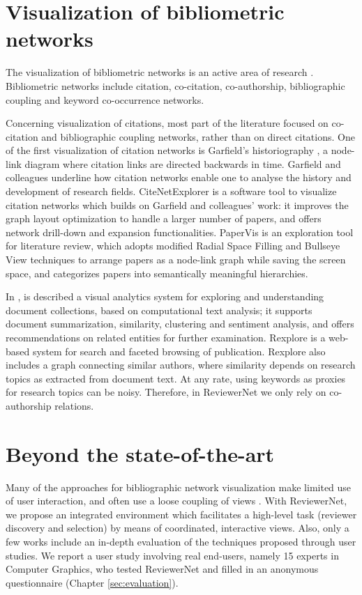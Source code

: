\section{Visualization of bibliometric networks}
\label{sec:bibvis}
The visualization of bibliometric networks is an active area of research \cite{Ch13,FeHe17}. Bibliometric networks include citation, co-citation, co-authorship, bibliographic coupling and keyword co-occurrence networks. 

Concerning visualization of citations, most part of the literature focused on co-citation and bibliographic coupling networks, rather than on direct citations. One of the first visualization of citation networks is Garfield's historiography \cite{GaPu03}, a node-link diagram where citation links are directed backwards in time. Garfield and colleagues underline how citation networks enable one to analyse the history and development of research fields. CiteNetExplorer \cite{vEWa14} is a software tool to visualize citation networks which builds on Garfield and colleagues' work: it improves the graph layout optimization to handle a larger number of papers, and offers network drill-down and expansion functionalities. PaperVis \cite{ChYa11} is an exploration tool for literature review, which adopts modified Radial Space Filling and Bullseye View techniques to arrange papers as a node-link graph while saving the screen space, and categorizes papers into semantically meaningful hierarchies. 

In \cite{GoLi13}, is described a visual analytics system for exploring and understanding document collections, based on computational text analysis; it supports document summarization, similarity, clustering and sentiment analysis, and offers recommendations on related entities for further examination. Rexplore \cite{OsMo13} is a web-based system for search and faceted browsing of publication. Rexplore also includes a graph connecting similar authors, where similarity depends on research topics as extracted from document text. At any rate, using keywords as proxies for research topics can be noisy. Therefore, in ReviewerNet we only rely on co-authorship relations.    

\section{Beyond the state-of-the-art}

Many of the approaches for bibliographic network visualization make limited use of user interaction, and often use a loose coupling of views \cite{FeHe17}. With ReviewerNet, we propose an integrated environment which facilitates a high-level task (reviewer discovery and selection) by means of coordinated, interactive views. Also, only a few works include an in-depth evaluation of the techniques proposed through user studies. We report a user study involving real end-users, namely 15 experts in Computer Graphics, who tested ReviewerNet and filled in an anonymous questionnaire (Chapter \ref{sec:evaluation}).  

